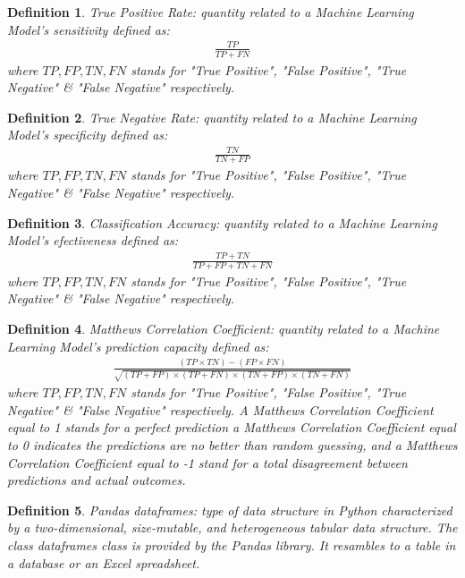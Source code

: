 \documentclass[11pt]{article}
\newtheorem{definition}{Definition}
\begin{document}
\begin{definition}\label{definitionTruePositiveRate}
True Positive Rate: quantity related to a Machine Learning Model's sensitivity defined as:
\begin{align}
\frac{TP}{TP+FN}
\end{align}
where $TP,FP,TN,FN$ stands for "True Positive", "False Positive", "True Negative" \& "False Negative" respectively.
\end{definition}

\begin{definition}\label{definitionTrueNegativeRate}
True Negative Rate: quantity related to a Machine Learning Model's specificity defined as:
\begin{align}
\frac{TN}{TN+FP}
\end{align}
where $TP,FP,TN,FN$ stands for "True Positive", "False Positive", "True Negative" \& "False Negative" respectively.
\end{definition}

\begin{definition}\label{definitionClassificationAccuracy}
Classification Accuracy: quantity related to a Machine Learning Model's efectiveness defined as:
\begin{align}
\frac{TP+TN}{TP+FP+TN+FN}
\end{align}
where $TP,FP,TN,FN$ stands for "True Positive", "False Positive", "True Negative" \& "False Negative" respectively.
\end{definition}

\begin{definition}\label{definitionMatthewsCorrelationCoeficient}
Matthews Correlation Coefficient: quantity related to a Machine Learning Model's prediction capacity defined as:
{\scriptsize
\begin{align}
\frac{(TP\times TN)-(FP\times FN)}{\sqrt{(TP+FP)\times(TP+FN)\times(TN+FP)\times(TN+FN)}}
\end{align}
}where $TP,FP,TN,FN$ stands for "True Positive", "False Positive", "True Negative" \& "False Negative" respectively.
A Matthews Correlation Coefficient equal to 1 stands for a perfect prediction a Matthews Correlation Coefficient equal to 0 indicates the predictions are no better than random guessing, and a Matthews Correlation Coefficient equal to -1 stand for a total disagreement between predictions and actual outcomes.
\end{definition}

\begin{definition}\label{definitionPandasDataFrames}
Pandas dataframes: type of data structure in Python characterized by a two-dimensional, size-mutable, and heterogeneous tabular data structure. The class dataframes class is provided by the Pandas library\cite{PythonPackagePandas}. It resambles to a table in a database or an Excel spreadsheet.
\end{definition}
\end{document}
